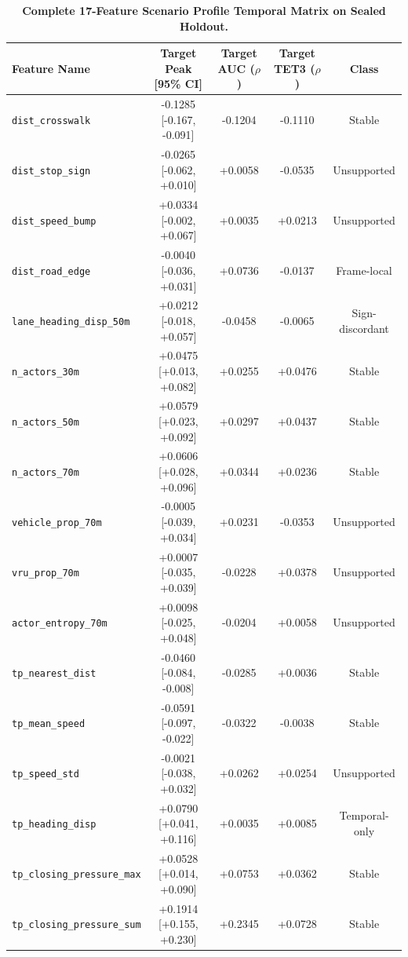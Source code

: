 \begin{table}[h]
\centering
\footnotesize
\setlength{\tabcolsep}{3.5pt}
\renewcommand{\arraystretch}{0.88}
\vspace{-3mm}
\caption{\textbf{Complete 17-Feature Scenario Profile Temporal Matrix on Sealed Holdout.}}
\label{tab:supp_scenario}
\begin{tabular}{lcccc}
\toprule
\textbf{Feature Name} & \textbf{Target Peak [95\% CI]} & \textbf{Target AUC ($\rho$)} & \textbf{Target TET3 ($\rho$)} & \textbf{Class} \\
\midrule
\texttt{dist\_crosswalk} & -0.1285 [-0.167, -0.091] & -0.1204 & -0.1110 & Stable \\
\texttt{dist\_stop\_sign} & -0.0265 [-0.062, +0.010] & +0.0058 & -0.0535 & Unsupported \\
\texttt{dist\_speed\_bump} & +0.0334 [-0.002, +0.067] & +0.0035 & +0.0213 & Unsupported \\
\texttt{dist\_road\_edge} & -0.0040 [-0.036, +0.031] & +0.0736 & -0.0137 & Frame-local \\
\texttt{lane\_heading\_disp\_50m} & +0.0212 [-0.018, +0.057] & -0.0458 & -0.0065 & Sign-discordant \\
\texttt{n\_actors\_30m} & +0.0475 [+0.013, +0.082] & +0.0255 & +0.0476 & Stable \\
\texttt{n\_actors\_50m} & +0.0579 [+0.023, +0.092] & +0.0297 & +0.0437 & Stable \\
\texttt{n\_actors\_70m} & +0.0606 [+0.028, +0.096] & +0.0344 & +0.0236 & Stable \\
\texttt{vehicle\_prop\_70m} & -0.0005 [-0.039, +0.034] & +0.0231 & -0.0353 & Unsupported \\
\texttt{vru\_prop\_70m} & +0.0007 [-0.035, +0.039] & -0.0228 & +0.0378 & Unsupported \\
\texttt{actor\_entropy\_70m} & +0.0098 [-0.025, +0.048] & -0.0204 & +0.0058 & Unsupported \\
\texttt{tp\_nearest\_dist} & -0.0460 [-0.084, -0.008] & -0.0285 & +0.0036 & Stable \\
\texttt{tp\_mean\_speed} & -0.0591 [-0.097, -0.022] & -0.0322 & -0.0038 & Stable \\
\texttt{tp\_speed\_std} & -0.0021 [-0.038, +0.032] & +0.0262 & +0.0254 & Unsupported \\
\texttt{tp\_heading\_disp} & +0.0790 [+0.041, +0.116] & +0.0035 & +0.0085 & Temporal-only \\
\texttt{tp\_closing\_pressure\_max} & +0.0528 [+0.014, +0.090] & +0.0753 & +0.0362 & Stable \\
\texttt{tp\_closing\_pressure\_sum} & +0.1914 [+0.155, +0.230] & +0.2345 & +0.0728 & Stable \\
\bottomrule
\end{tabular}
\end{table}

